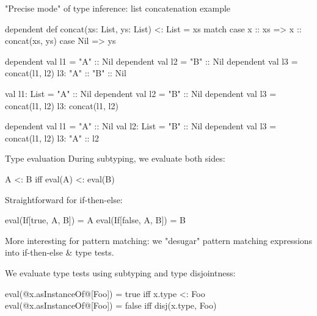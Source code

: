 \documentclass[10pt]{beamer}
\newenvironment{slide}[2][]
  {\begin{frame}[fragile,environment=slide,#1]{#2}}
  {\end{frame}}
\newcommand{\tp}[1]{\color{typeColor}#1}
\begin{document}
\begin{slide}{"Precise mode" of type inference: list concatenation example}
\begin{code}
dependent def concat(xs: List, ys: List) <: List =
  xs match
    case x :: xs => x :: concat(xs, ys)
    case Nil => ys
\end{code}
\pause
\begin{overprint}
\begin{code}
dependent val l1 = "A" :: Nil
dependent val l2 = "B" :: Nil
dependent val l3 = concat(l1, l2)
l3: { "A" :: "B" :: Nil }
\end{code}

\begin{code}
val l1: List     = "A" :: Nil
dependent val l2 = "B" :: Nil
dependent val l3 = concat(l1, l2)
l3: { concat(l1, l2) }
\end{code}

\begin{code}
dependent val l1 = "A" :: Nil
val l2: List     = "B" :: Nil
dependent val l3 = concat(l1, l2)
l3: { "A" :: l2 }
\end{code}

\end{overprint}
\end{slide}

\begin{slide}{Type evaluation}
During subtyping, we evaluate both sides:
\begin{code}
A <: B  iff  eval(A) <: eval(B)
\end{code}
\pause

Straightforward for if-then-else:
\begin{code}
eval(If[true, A, B]) = A
eval(If[false, A, B]) = B
\end{code}
\pause

More interesting for pattern matching: we "desugar" pattern matching expressions into if-then-else \& type tests.
\pause
\smallskip

We evaluate type tests using subtyping and type disjointness:
\begin{code}
eval(@\tp{x.asInstanceOf}@[Foo]) = true   iff  x.type <: Foo
eval(@\tp{x.asInstanceOf}@[Foo]) = false  iff  disj(x.type, Foo)
\end{code}
\end{slide}
\end{document}
